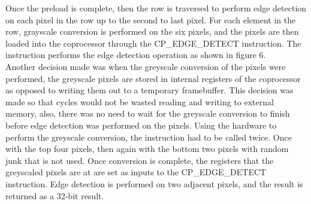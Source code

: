 \documentclass{article}
\begin{document}
Once the preload is complete, then the row is traversed to perform edge detection on each pixel in the row up to the second to last pixel. For each element in the row, grayscale conversion is performed on the six pixels, and the pixels are then loaded into the coprocessor through the CP\_EDGE\_DETECT instruction. The instruction performs the edge detection operation as shown in figure 6. \\

Another decision made was when the greyscale conversion of the pixels were performed, the greyscale pixels are stored in internal registers of the coprocessor as opposed to writing them out to a temporary framebuffer. This decision was made so that cycles would not be wasted reading and writing to external memory, also, there was no need to wait for the greyscale conversion to finish before edge detection was performed on the pixels. Using the hardware to perform the greyscale conversion, the instruction had to be called twice. Once with the top four pixels, then again with the bottom two pixels with random junk that is not used. Once conversion is complete, the registers that the greyscaled pixels are at are set as inputs to the CP\_EDGE\_DETECT instruction. Edge detection is performed on two adjacent pixels, and the result is returned as a 32-bit result.\\
\end{document}
